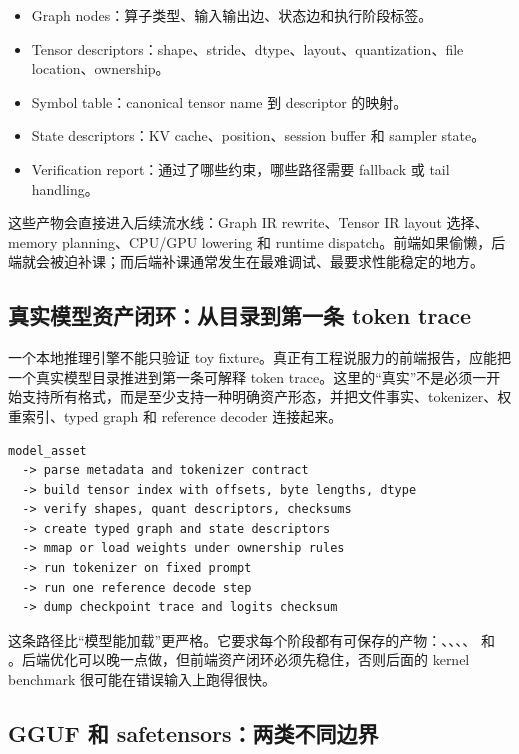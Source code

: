 \begin{itemize}
  \item Graph nodes：算子类型、输入输出边、状态边和执行阶段标签。
  \item Tensor descriptors：shape、stride、dtype、layout、quantization、file location、ownership。
  \item Symbol table：canonical tensor name 到 descriptor 的映射。
  \item State descriptors：KV cache、position、session buffer 和 sampler state。
  \item Verification report：通过了哪些约束，哪些路径需要 fallback 或 tail handling。
\end{itemize}

这些产物会直接进入后续流水线：Graph IR rewrite、Tensor IR layout 选择、memory planning、CPU/GPU lowering 和 runtime dispatch。前端如果偷懒，后端就会被迫补课；而后端补课通常发生在最难调试、最要求性能稳定的地方。

\subsection{真实模型资产闭环：从目录到第一条 token trace}

一个本地推理引擎不能只验证 toy fixture。真正有工程说服力的前端报告，应能把一个真实模型目录推进到第一条可解释 token trace。这里的“真实”不是必须一开始支持所有格式，而是至少支持一种明确资产形态，并把文件事实、tokenizer、权重索引、typed graph 和 reference decoder 连接起来。

\begin{lstlisting}[numbers=none,caption={真实模型导入的最小验收路径}]
model_asset
  -> parse metadata and tokenizer contract
  -> build tensor index with offsets, byte lengths, dtype
  -> verify shapes, quant descriptors, checksums
  -> create typed graph and state descriptors
  -> mmap or load weights under ownership rules
  -> run tokenizer on fixed prompt
  -> run one reference decode step
  -> dump checkpoint trace and logits checksum
\end{lstlisting}

这条路径比“模型能加载”更严格。它要求每个阶段都有可保存的产物：、、、、 和 。后端优化可以晚一点做，但前端资产闭环必须先稳住，否则后面的 kernel benchmark 很可能在错误输入上跑得很快。

\subsection{GGUF 和 safetensors：两类不同边界}

